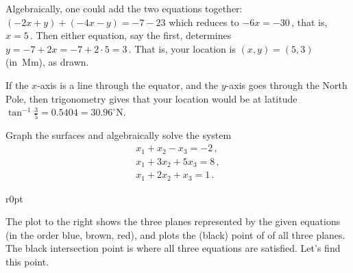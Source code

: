 \begin{example}
\begin{solution}
Algebraically, one could add the two equations together: \((-2x+y)+(-4x-y)=-7-23\) which reduces to \(-6x=-30\)\,, that is, \(x=5\)\,.
Then either equation, say the first, determines~\(y=-7+2x=-7+2\cdot 5=3\)\,.  
That is, your location is \((x,y)=(5,3)\) (in~Mm), as drawn.
\end{solution}

If the \(x\)-axis is a line through the equator, and the \(y\)-axis goes through the North Pole, then trigonometry gives that your location would be at latitude
\(\tan^{-1}\frac35=0.5404=30.96^\circ\)N.
\end{example}





\begin{example} 
\label{eg:3eq3var}
Graph the surfaces and algebraically solve the system
\begin{equation*}
\begin{array}{l}
x_1+x_2-x_3=-2\,,\\
x_1+3x_2+5x_3=8\,,\\
x_1+2x_2+x_3=1\,.
\end{array}
\end{equation*}

\begin{solution} 
\begin{wrapfigure}[8]r{0pt}
\end{wrapfigure}
The plot to the right shows the three planes represented by the given equations (in the order blue, brown, red), and plots the (black) point of  of all three planes.
The black intersection point is where all three equations are satisfied.
Let's find this point.


\end{solution}
\end{example}
